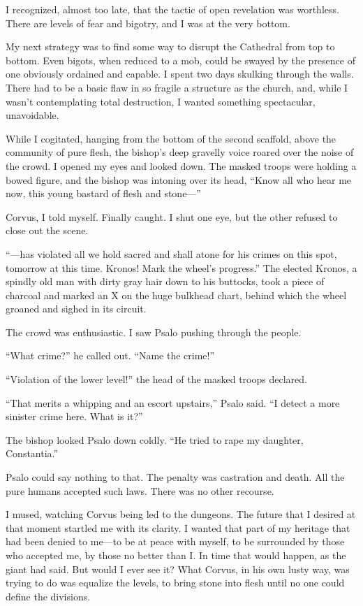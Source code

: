 I recognized, almost too late, that the tactic of open revelation was worthless. There are levels of fear and bigotry, and I was at the very bottom.

My next strategy was to find some way to disrupt the Cathedral from top to bottom. Even bigots, when reduced to a mob, could be swayed by the presence of one obviously ordained and capable. I spent two days skulking through the walls. There had to be a basic flaw in so fragile a structure as the church, and, while I wasn’t contemplating total destruction, I wanted something spectacular, unavoidable.

While I cogitated, hanging from the bottom of the second scaffold, above the community of pure flesh, the bishop’s deep gravelly voice roared over the noise of the crowd. I opened my eyes and looked down. The masked troops were holding a bowed figure, and the bishop was intoning over its head, “Know all who hear me now, this young bastard of flesh and stone—”

Corvus, I told myself. Finally caught. I shut one eye, but the other refused to close out the scene.

“—has violated all we hold sacred and shall atone for his crimes on this spot, tomorrow at this time. Kronos! Mark the wheel’s progress.” The elected Kronos, a spindly old man with dirty gray hair down to his buttocks, took a piece of charcoal and marked an X on the huge bulkhead chart, behind which the wheel groaned and sighed in its circuit.

The crowd was enthusiastic. I saw Psalo pushing through the people.

“What crime?” he called out. “Name the crime!”

“Violation of the lower level!” the head of the masked troops declared.

“That merits a whipping and an escort upstairs,” Psalo said. “I detect a more sinister crime here. What is it?”

The bishop looked Psalo down coldly. “He tried to rape my daughter, Constantia.”

Psalo could say nothing to that. The penalty was castration and death. All the pure humans accepted such laws. There was no other recourse.

I mused, watching Corvus being led to the dungeons. The future that I desired at that moment startled me with its clarity. I wanted that part of my heritage that had been denied to me—to be at peace with myself, to be surrounded by those who accepted me, by those no better than I. In time that would happen, as the giant had said. But would I ever see it? What Corvus, in his own lusty way, was trying to do was equalize the levels, to bring stone into flesh until no one could define the divisions.

